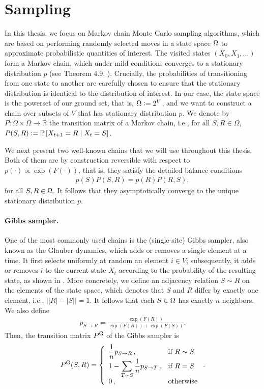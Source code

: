 \section{Sampling}
In this thesis, we focus on Markov chain Monte Carlo sampling algorithms, which are based on performing randomly selected moves in a state space $\ss$ to approximate probabilistic quantities of interest.
The visited states $(X_0, X_1,\ldots)$ form a Markov chain, which under mild conditions converges to a stationary distribution $p$ (see Theorem 4.9, \citealp{levin08book}).
Crucially, the probabilities of transitioning from one state to another are carefully chosen to ensure that the stationary distribution is identical to the distribution of interest.
In our case, the state space is the powerset of our ground set, that is, $\ss \defeq 2^V$, and we want to construct a chain over subsets of $V$ that has stationary distribution $p$.
We denote by $P : \Omega \times \Omega \to \mathbb{R}$ the transition matrix of a Markov chain, i.e., for all $S, R \in \Omega$, $P(S, R) \defeq \P\left[ X_{t+1} = R \mid X_t = S \right]$.

We next present two well-known chains that we will use throughout this thesis.
Both of them are by construction reversible with respect to $p(\cdot) \propto \exp(F(\cdot))$, that is, they satisfy the detailed balance conditions
\begin{align*}
p(S) P(S, R) = p(R) P(R, S),
\end{align*}
for all $S, R \in \ss$.
It follows that they asymptotically converge to the unique stationary distribution $p$.

\paragraph{Gibbs sampler.}
One of the most commonly used chains is the (single-site) Gibbs sampler, also known as the Glauber dynamics, which adds or removes a single element at a time.
It first selects uniformly at random an element $i \in V$; subsequently, it adds or removes $i$ to the current state $X_t$ according to the probability of the resulting state, as shown in .
More concretely, we define an adjacency relation $S \sim R$ on the elements of the state space, which denotes that $S$ and $R$ differ by exactly one element, i.e., $\big||R| - |S|\big| = 1$.
It follows that each $S \in \ss$ has exactly $n$ neighbors.
We also define
\begin{align*}
p_{S \rightarrow R} = \displaystyle\frac{\exp(F(R))}{\exp(F(R)) + \exp(F(S))}.
\end{align*}
Then, the transition matrix $\Pg$ of the Gibbs sampler is
\begin{align*}
  \Pg(S, R) = 
  \threepartdefo{\displaystyle\frac{1}{n}p_{S \rightarrow R}}{R \sim S}{1 - \displaystyle\sum_{T \sim S} \displaystyle\frac{1}{n}p_{S \rightarrow T}}{R = S}{0}.
\end{align*}

